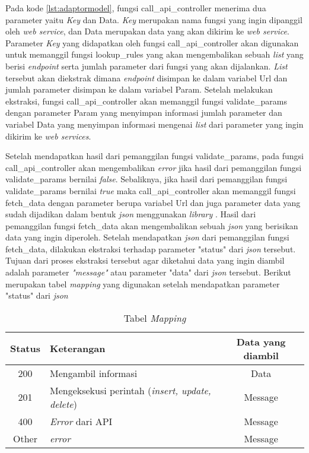 Pada kode \ref{lst:adaptormodel}, fungsi call\_api\_controller menerima dua parameter yaitu \textit{Key} dan Data. \textit{Key} merupakan nama fungsi yang ingin dipanggil oleh \textit{web service}, dan Data merupakan data yang akan dikirim ke \textit{web service}. Parameter \textit{Key} yang didapatkan oleh fungsi call\_api\_controller akan digunakan untuk memanggil fungsi lookup\_rules yang akan mengembalikan sebuah \textit{list} yang berisi \textit{endpoint} serta jumlah parameter dari fungsi yang akan dijalankan. \textit{List} tersebut akan diekstrak dimana \textit{endpoint} disimpan ke dalam variabel Url dan jumlah parameter disimpan ke dalam variabel Param. Setelah melakukan ekstraksi, fungsi call\_api\_controller akan memanggil fungsi validate\_params dengan parameter Param yang menyimpan informasi jumlah parameter dan variabel Data yang menyimpan informasi mengenai \textit{list} dari parameter yang ingin dikirim ke \textit{web services}.

Setelah mendapatkan hasil dari pemanggilan fungsi validate\_params, pada fungsi call\_api\_controller akan mengembalikan \textit{error} jika hasil dari pemanggilan fungsi validate\_params bernilai \textit{false}. Sebaliknya, jika hasil dari pemanggilan fungsi validate\_params bernilai \textit{true} maka call\_api\_controller akan memanggil fungsi fetch\_data dengan parameter berupa variabel Url dan juga parameter data yang sudah dijadikan dalam bentuk \textit{json} menggunakan \textit{library} . Hasil dari pemanggilan fungsi fetch\_data akan mengembalikan sebuah \textit{json} yang berisikan data yang ingin diperoleh. Setelah mendapatkan \textit{json} dari pemanggilan fungsi fetch\_data, dilakukan ekstraksi terhadap parameter "status" dari \textit{json} tersebut. Tujuan dari proses ekstraksi tersebut agar diketahui data yang ingin diambil adalah parameter \textit{"message"} atau parameter "data" dari \textit{json} tersebut. Berikut merupakan tabel \textit{mapping} yang digunakan setelah mendapatkan parameter "status" dari \textit{json}

\begin{table}
	\centering
	\caption{Tabel \textit{Mapping}}
	\label{tab:statuscode}
	\begin{tabular}{| c | l | c |}
		\hline
		Status & Keterangan & Data yang diambil \\ 
		\hline
		200 & Mengambil informasi & Data \\
		201 & Mengeksekusi perintah (\textit{insert, update, delete}) & Message \\
		400 & \textit{Error} dari API & Message \\
		Other & \textit{error} & Message \\
		\hline
	\end{tabular}
\end{table}


